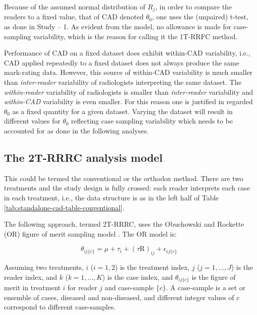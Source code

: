 \documentclass[
]{book}
\begin{document}
Because of the assumed normal distribution of \(R_j\), in order to compare the readers to a fixed value, that of CAD denoted \(\theta_0\), one uses the (unpaired) t-test, as done in Study -- 1. As evident from the model, no allowance is made for case-sampling variability, which is the reason for calling it the 1T-RRFC method.

Performance of CAD on a fixed dataset does exhibit within-CAD variability, i.e., CAD applied repeatedly to a fixed dataset does not always produce the same mark-rating data. However, this source of within-CAD variability is much smaller than \emph{inter-reader} variability of radiologists interpreting the same dataset. The \emph{within-reader} variability of radiologists is smaller than \emph{inter-reader} variability and \emph{within-CAD} variability is even smaller. For this reason one is justified in regarded \(\theta_0\) as a fixed quantity for a given dataset. Varying the dataset will result in different values for \(\theta_0\) reflecting case sampling variability which needs to be accounted for as done in the following analyses.

\hypertarget{standalone-cad-radiologists-2TRRRC-anlaysis}{%
\subsection{The 2T-RRRC analysis model}\label{standalone-cad-radiologists-2TRRRC-anlaysis}}

This could be termed the conventional or the orthodox method. There are two treatments and the study design is fully crossed: each reader interprets each case in each treatment, i.e., the data structure is as in the left half of Table \ref{tab:standalone-cad-table-conventional}.

The following approach, termed 2T-RRRC, uses the Obuchowski and Rockette (OR) figure of merit sampling model \citep{obuchowski1995hypothesis}. The OR model is:

\begin{equation}
\theta_{ij\{c\}}=\mu+\tau_i+\left ( \tau \text{R} \right )_{ij}+\epsilon_{ij\{c\}}
\label{eq:standalone-cad-model-2t-rrrc}
\end{equation}

Assuming two treatments, \(i\) (\(i = 1, 2\)) is the treatment index, \(j\) (\(j = 1, ..., J\)) is the reader index, and \(k\) (\(k = 1, ..., K\)) is the case index, and \(\theta_{ij\{c\}}\) is the figure of merit in treatment \(i\) for reader \(j\) and case-sample \(\{c\}\). A case-sample is a set or ensemble of cases, diseased and non-diseased, and different integer values of \(c\) correspond to different case-samples.
\end{document}

